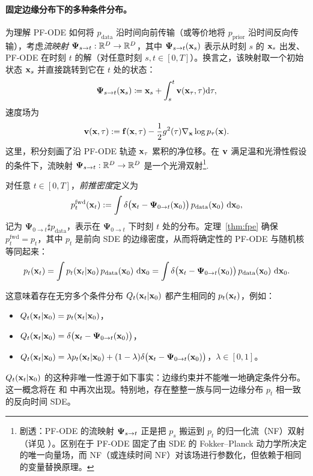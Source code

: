 

\paragraph{固定边缘分布下的多种条件分布。}
为理解 PF-ODE 如何将 $p_{\mathrm{data}}$ 沿时间向前传输（或等价地将 $p_{\mathrm{prior}}$ 沿时间反向传输），考虑\emph{流映射} ${\bm{\Psi}}_{s \to t}: \mathbb{R}^D \to \mathbb{R}^D$，其中 ${\bm{\Psi}}_{s \to t}({\mathbf{x}}_s)$ 表示从时刻 $s$ 的 ${\mathbf{x}}_s$ 出发、PF-ODE 在时刻 $t$ 的解（对任意时刻 $s, t \in[0,T]$）。换言之，该映射取一个初始状态 ${\mathbf{x}}_s$ 并直接跳转到它在 $t$ 处的状态：
\begin{align}\label{eq:flow-map-def}
{\bm{\Psi}}_{s \to t}({\mathbf{x}}_s) \coloneqq {\mathbf{x}}_s + \int_s^t {\mathbf{v}}({\mathbf{x}}_\tau, \tau)\mathrm{d}\tau,
\end{align}
速度场为
\begin{align*}
{\mathbf{v}}({\mathbf{x}}, \tau) := {\mathbf{f}}({\mathbf{x}}, \tau) - \frac{1}{2} g^2(\tau)\nabla_{{\mathbf{x}}}\log p_\tau({\mathbf{x}}).
\end{align*}
这里，积分刻画了沿 PF-ODE 轨迹 ${\mathbf{x}}_\tau$ 累积的净位移。在 ${\mathbf{v}}$ 满足温和光滑性假设的条件下，流映射 ${\bm{\Psi}}_{s \to t}: \mathbb{R}^D \to \mathbb{R}^D$ 是一个光滑双射\footnote{剧透：PF-ODE 的流映射 ${\bm{\Psi}}_{s\to t}$ 正是把 $p_s$ 搬运到 $p_t$ 的归一化流（NF）双射（详见 ）。区别在于 PF-ODE 固定了由 SDE 的 Fokker–Planck 动力学所决定的唯一向量场，而 NF（或连续时间 NF）对该场进行参数化，但依赖于相同的变量替换原理。
}.




对任意 $t\in[0,T]$，\emph{前推密度}定义为
\[
p_t^{\mathrm{fwd}}({\mathbf{x}}_t) := \int \delta\bigl({\mathbf{x}}_t - {\bm{\Psi}}_{0 \to t}({\mathbf{x}}_0)\bigr)\, p_{\mathrm{data}}({\mathbf{x}}_0) \,\mathop{}\!\mathrm{d} {\mathbf{x}}_0,
\]
记为 $\bm{\Psi}_{0\to t} \sharp p_{\mathrm{data}}$，表示在 $\bm{\Psi}_{0\to t}$ 下时刻 $t$ 处的分布。定理~\ref{thm:fpe} 确保 $p_t^{\mathrm{fwd}} = p_t$，其中 $p_t$ 是前向 SDE 的边缘密度，从而将确定性的 PF-ODE 与随机核等同起来：
\[
p_t({\mathbf{x}}_t) = \int p_t({\mathbf{x}}_t |{\mathbf{x}}_0)\, p_{\mathrm{data}}({\mathbf{x}}_0)\,\mathop{}\!\mathrm{d} {\mathbf{x}}_0
= \int \delta\bigl({\mathbf{x}}_t - \bm{\Psi}_{0\to t}({\mathbf{x}}_0)\bigr)\, p_{\mathrm{data}}({\mathbf{x}}_0)\,\mathop{}\!\mathrm{d} {\mathbf{x}}_0.
\]

这意味着存在无穷多个条件分布 $Q_t({\mathbf{x}}_t |{\mathbf{x}}_0)$ 都产生相同的 $p_t({\mathbf{x}}_t)$，例如：
\begin{itemize}
  \item {}$Q_t({\mathbf{x}}_t |{\mathbf{x}}_0) = p_t({\mathbf{x}}_t |{\mathbf{x}}_0)$，
  \item {}$Q_t({\mathbf{x}}_t |{\mathbf{x}}_0) = \delta\bigl({\mathbf{x}}_t - \bm{\Psi}_{0\to t}({\mathbf{x}}_0)\bigr)$，
  \item {}$Q_t({\mathbf{x}}_t |{\mathbf{x}}_0) = \lambda p_t({\mathbf{x}}_t |{\mathbf{x}}_0) + (1-\lambda)\delta\bigl({\mathbf{x}}_t - \bm{\Psi}_{0\to t}({\mathbf{x}}_0)\bigr)$，$\lambda\in[0,1]$。
\end{itemize}
$Q_t({\mathbf{x}}_t |{\mathbf{x}}_0)$ 的这种非唯一性源于如下事实：边缘约束并不能唯一地确定条件分布。这一概念将在  和  中再次出现。特别地，存在整整一族与同一边缘分布 $p_t$ 相一致的反向时间 SDE。

